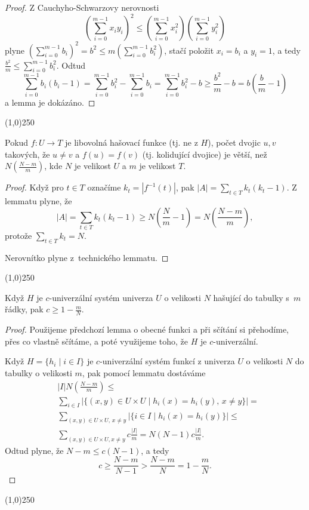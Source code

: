 \documentclass[a4paper,12pt]{article}
\newenvironment{myproof}{
  \begin{proof}
    
  }{
  \end{proof}
  \begin{center}
   \line(1,0){250}
   \end{center}
  }
\begin{document}
\begin{myproof}Z Cauchyho-Schwarzovy nerovnosti 
$$(\sum_{i=0}^{m-1}x_iy_i)^2\le (\sum_{i=0}^{m-1}x^2_i)(\sum_{i=0}^{
m-1}y_i^2)$$
plyne $(\sum_{i=0}^{m-1}b_i)^2=b^2\le m(\sum_{i=0}^{m-1}b_i^2)$, stačí položit 
$x_i=b_i$ a $y_i=1$, a tedy $\frac {b^2}m\le\sum_{i=0}^{m-1}b_i^2$. Odtud
$$\sum_{i=0}^{m-1}b_i(b_i-1)=\sum_{i=0}^{m-1}b_i^2-\sum_{i=0}^{m-
1}b_i=\sum_{i=0}^{m-1}b_i^2-b\ge\frac {b^2}m-b=b(\frac bm-1)$$
a lemma je dokázáno.
\end{myproof}

\begin{lemma}
    Pokud $f:U\to T$ je libovolná hašovací funkce (tj. ne z $H$), počet dvojic $u,v$ takových, že $u\ne v$ a $
    f(u)=f(v)$ (tj. kolidující dvojice) je větší, než $N(\frac {N-m}m)$, kde $N$ je velikost $U$ a $m$ je velikost $T$.
\end{lemma}
\begin{myproof}
    Když pro $t\in T$ označíme $k_t=|f^{-1}(t)|$, pak $|A|=
    \sum_{t\in T}k_t(k_t-1)$.
    Z lemmatu plyne, že 
    $$|A|=\sum_{t\in T}k_t(k_t-1)\ge N(\frac Nm-1)=N(\frac {N-m}m),$$
    protože $\sum_{t\in T}k_t=N$.
    
    Nerovnítko plyne z~technického lemmatu.
\end{myproof}

\begin{veta}Když $H$ je $c$-univerzální 
systém univerza $U$ o velikosti $N$ hašující do tabulky s~$
m$ řádky, 
pak $c\ge 1-\frac mN$.
\end{veta}


\begin{myproof}

Použijeme předchozí lemma o obecné funkci a při sčítání si  přehodíme, přes co vlastně sčítáme, a poté využijeme toho, že $H$ je $c$-univerzální.

Když $H=\{h_i\mid i\in I\}$ je $c$-univerzální systém funkcí z univerza $
U$ o 
velikosti $N$ do tabulky o velikosti $m$, pak pomocí 
lemmatu dostáváme 
\begin{align*}&|I|N(\frac {N-m}m)\le\\
&\sum_{i\in I}|\{(x,y)\in U\times U\mid h_i(x)=h_i(y),\,x\ne y\}|
=\\
&\sum_{(x,y)\in U\times U,\,x\ne y}|\{i\in I\mid h_i(x)=h_i(y)\}|
\le\\
&\sum_{(x,y)\in U\times U,x\ne y}c\frac {|I|}m=N(N-1)c\frac {|I|}
m.\end{align*}
Odtud plyne, že $N-m\le c(N-1)$, a tedy 
$$c\ge\frac {N-m}{N-1}>\frac {N-m}N=1-\frac mN.$$
\end{myproof}
\end{document}
